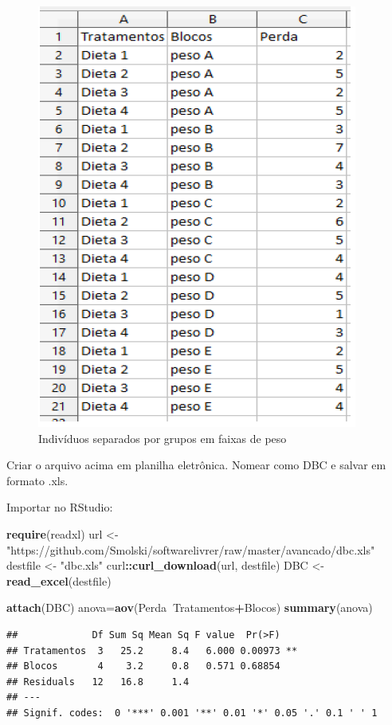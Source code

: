 \documentclass[12pt,brazil,]{book}
\newenvironment{Shaded}{\begin{snugshade}}{\end{snugshade}}
\newcommand{\KeywordTok}[1]{\textcolor[rgb]{0.13,0.29,0.53}{\textbf{#1}}}
\newcommand{\NormalTok}[1]{#1}
\newcommand{\OperatorTok}[1]{\textcolor[rgb]{0.81,0.36,0.00}{\textbf{#1}}}
\newcommand{\StringTok}[1]{\textcolor[rgb]{0.31,0.60,0.02}{#1}}
\begin{document}
\begin{figure}
\centering
\includegraphics{delimexp1.png}
\caption{Indivíduos separados por grupos em faixas de peso}
\end{figure}

Criar o arquivo acima em planilha eletrônica. Nomear como DBC e salvar
em formato .xls.

Importar no RStudio:

\begin{Shaded}
\begin{Highlighting}[]
\KeywordTok{require}\NormalTok{(readxl)}
\NormalTok{url <-}\StringTok{ "https://github.com/Smolski/softwarelivrer/raw/master/avancado/dbc.xls"}
\NormalTok{destfile <-}\StringTok{ "dbc.xls"}
\NormalTok{curl}\OperatorTok{::}\KeywordTok{curl_download}\NormalTok{(url, destfile)}
\NormalTok{DBC  <-}\StringTok{ }\KeywordTok{read_excel}\NormalTok{(destfile)}

\KeywordTok{attach}\NormalTok{(DBC)}
\NormalTok{anova=}\KeywordTok{aov}\NormalTok{(Perda}\OperatorTok{~}\NormalTok{Tratamentos}\OperatorTok{+}\NormalTok{Blocos)}
\KeywordTok{summary}\NormalTok{(anova)}
\end{Highlighting}
\end{Shaded}

\begin{verbatim}
##             Df Sum Sq Mean Sq F value  Pr(>F)   
## Tratamentos  3   25.2     8.4   6.000 0.00973 **
## Blocos       4    3.2     0.8   0.571 0.68854   
## Residuals   12   16.8     1.4                   
## ---
## Signif. codes:  0 '***' 0.001 '**' 0.01 '*' 0.05 '.' 0.1 ' ' 1
\end{verbatim}
\end{document}
